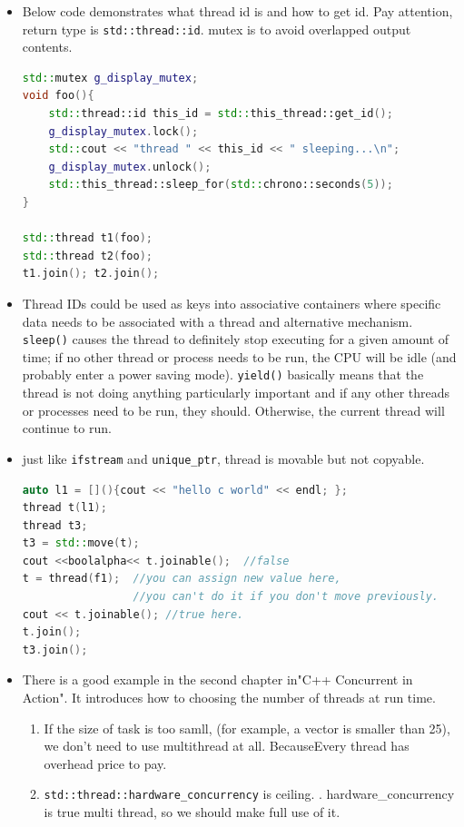 \documentclass[a4paper,11pt,twoside]{book}
\begin{document}
\begin{itemize}

	\item Below code demonstrates what thread id is and how to get id. Pay attention, return type is \texttt{std::thread::id}.  mutex is to avoid overlapped output contents.
\begin{lstlisting}[frame=single, language=c++]
std::mutex g_display_mutex;
void foo(){
	std::thread::id this_id = std::this_thread::get_id();
	g_display_mutex.lock();
	std::cout << "thread " << this_id << " sleeping...\n";
	g_display_mutex.unlock();	
	std::this_thread::sleep_for(std::chrono::seconds(5));
}

std::thread t1(foo);
std::thread t2(foo);	
t1.join(); t2.join();
\end{lstlisting}		

	
	\item Thread IDs could be used as keys into associative containers where specific data needs to be associated with a thread and alternative mechanism.  \texttt{sleep()} causes the thread to definitely stop executing for a given amount of time; if no other thread or process needs to be run, the CPU will be idle (and probably enter a power saving mode). \texttt{yield()} basically means that the thread is not doing anything particularly important and if any other threads or processes need to be run, they should. Otherwise, the current thread will continue to run.
	
	\item just like \texttt{ifstream} and \texttt{unique\_ptr}, thread is movable but not copyable. 
\begin{lstlisting}[frame=single, language=c++]
auto l1 = [](){cout << "hello c world" << endl; };
thread t(l1);   
thread t3;
t3 = std::move(t);
cout <<boolalpha<< t.joinable();  //false
t = thread(f1);  //you can assign new value here, 
                 //you can't do it if you don't move previously.
cout << t.joinable(); //true here.
t.join();
t3.join();
\end{lstlisting}	
	
	\item There is a good example in the second chapter in"C++ Concurrent in Action". It introduces how to choosing the number of threads at run time.
	\begin{enumerate}
		\item If the size of task is too samll, (for example, a vector is smaller than 25), we don't need to use multithread at all. BecauseEvery thread has overhead price to pay.
		\item \texttt{std::thread::hardware\_concurrency} is ceiling. . hardware\_concurrency is true multi thread, so we should make full use of it.
	\end{enumerate}


\end{itemize}
\end{document}
